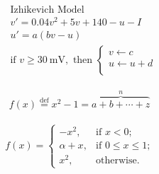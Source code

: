 \documentclass{article}
\begin{document}
\begin{flushleft}
\newpage
\eject \pdfpagewidth=3in \pdfpageheight=1.5in
\begin{equation}
\begin{split}
&\text{Izhikevich Model} \\
&v' = 0.04v^2+5v + 140 - u - I\\
&u' = a(bv-u)  \\
&\text{if } v\ge  \SI{30}{\mV}, \text{ then } 
\begin{cases}
    v \leftarrow c\\           
    u \leftarrow u+d\\           
\end{cases} \nonumber
\end{split}
\end{equation}



\newpage
\eject \pdfpagewidth=8in \pdfpageheight=1in
\begin{equation}
\label{eq:e1}
\begin{split}
f(x) \overset{ \text{def} }{=} x^{2} - 1 = 
\overbrace{a + b + \cdots + z}^{n}
\end{split}
\end{equation}

\begin{equation}
\label{eq:e2}
\begin{split}
f(x)=
\begin{cases}
    -x^{2},      &\text{if $x < 0$;}\\           
    \alpha + x,  &\text{if $0 \leq x \leq 1$;}\\
    x^{2},       &\text{otherwise.}             
\end{cases}
\end{split}
\end{equation}


 \end{flushleft}
 
\end{document}
